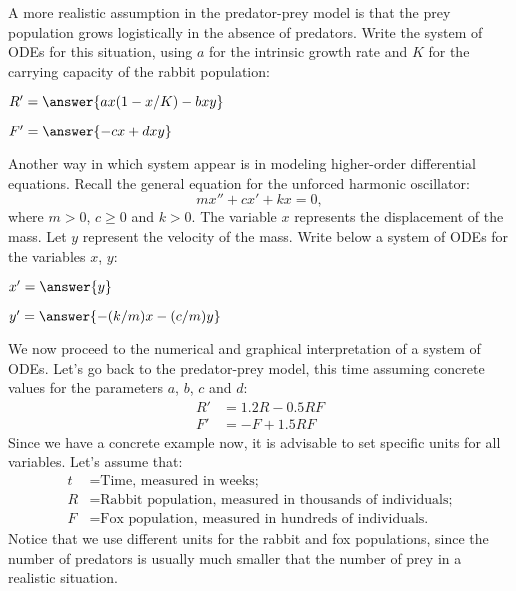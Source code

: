 \documentclass{ximera}
\begin{document}
\begin{problem}
A more realistic assumption in the predator-prey model is that the prey population grows logistically in the absence of predators. Write the system of ODEs for this situation, using $a$ for the intrinsic growth rate and $K$ for the carrying capacity of the rabbit population:
\begin{question}

$R'= \answer{ax(1-x/K)-bxy}$
\end{question}
\begin{question}

$F'= \answer{-cx+dxy}$
\end{question}
\end{problem}

\begin{problem} Another way in which system appear is in modeling higher-order differential equations. Recall the general equation for the unforced harmonic oscillator:
\[
mx''+cx'+kx=0,
\]
where $m>0$, $c\ge 0$ and $k>0$. The variable $x$ represents the displacement of the mass. Let $y$ represent the velocity of the mass. Write below a system of ODEs for the variables $x$, $y$:

\begin{question}
$x'= \answer{y}$
\end{question}

\begin{question}
$y'= \answer{-(k/m)x-(c/m)y}$
\end{question}

\end{problem}

We now proceed to the numerical and graphical interpretation of a system of ODEs. Let's go back to the predator-prey model, this time assuming concrete values for the parameters $a$, $b$, $c$ and $d$:
\begin{align}
\label{rabbit-eq-c}R'&=1.2R-0.5RF\\
\label{fox-eq-c}F'&=-F+1.5RF
\end{align}
Since we have a concrete example now, it is advisable to set specific units for all variables. Let's assume that:
\begin{align*}
t&=\text{Time, measured in weeks;}\\
R&=\text{Rabbit population, measured in thousands of individuals;}\\
F&=\text{Fox population, measured in hundreds of individuals.}
\end{align*}
Notice that we use different units for the rabbit and fox populations, since the number of predators is usually much smaller that the number of prey in a realistic situation.
\end{document}
